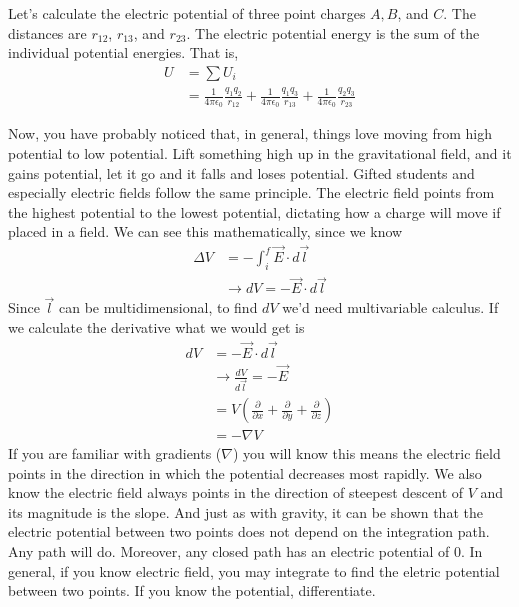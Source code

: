\documentclass[nobib]{tufte-handout}
\begin{document}
Let's calculate the electric potential of three point charges $A,B$, and $C$.
The distances are $r_{12}$, $r_{13}$, and $r_{23}$. The electric potential energy is 
the sum of the individual potential energies. That is, 
\begin{align*}
    U &= \sum U_i \\
    &= \frac{1}{4\pi \epsilon_0}\frac{q_1 q_2}{r_{12}} + \frac{1}{4\pi \epsilon_0}\frac{q_1 q_3}{r_{13}} + \frac{1}{4\pi \epsilon_0}\frac{q_2 q_3}{r_{23}}
\end{align*}

Now, you have probably noticed that, in general, things love moving from high potential to 
low potential. Lift something high up in the gravitational field, and it gains potential, let it go
and it falls and loses potential. Gifted students and especially electric fields follow the same 
principle. The electric field points from the highest potential to the lowest potential, 
dictating how a charge will move if placed in a field. We can see this mathematically, 
since we know 
\begin{align*}
    \Delta V &= -\int_{i}^{f} \vec{E} \cdot d\vec{l} \\
    &\rightarrow dV = -\vec{E}\cdot d\vec{l}
\end{align*}
Since $\vec{l}$ can be multidimensional, to find $dV$ we'd need multivariable calculus. 
If we calculate the derivative what we would get is 
\begin{align*}
    dV &= -\vec{E}\cdot d\vec{l} \\
    &\rightarrow \frac{dV}{d\vec{l}} = -\vec{E} \\
    &= V\left( \frac{\partial}{\partial x} + \frac{\partial}{\partial y} + \frac{\partial}{\partial z} \right) \\
    &= -\nabla V
\end{align*}
If you are familiar with gradients ($\nabla$) you will know this means
the electric field points in the direction in which the potential decreases most rapidly. 
We also know the electric field always points in the direction of
steepest descent of $V$ and its
magnitude is the slope. And just as with gravity, it can be shown that the 
electric potential between two points does not
depend on the integration path. Any path will do. Moreover, any closed path 
has an electric potential of 0. 
In general, if you know electric field, you may integrate to find 
the eletric potential between two points. If you know the potential, 
differentiate. 
\end{document}
